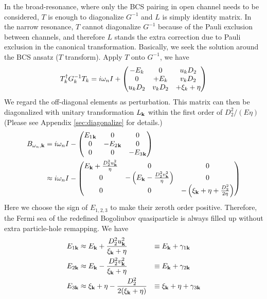 In the broad-resonance, where only the BCS pairing in open channel needs to be considered, $T$ is enough to diagonalize $G^{-1}$ and $L$ is simply identity matrix.  %
In the narrow resonance, $T$ cannot diagonalize $G^{-1}$ because of the Pauli exclusion between channels, and therefore $L$ stands the extra correction due to Pauli exclusion in the canonical transformation. Basically, we seek the solution around the BCS ansatz ($T$ transform). 
Apply $T$ onto $G^{-1}$, we have 
\begin{equation}\label{eq:pathInt2:G2}
T_k^{\dagger}G_k^{-1}T_k=i\omega_nI+\begin{pmatrix}-E_k&0&u_kD_2\\0&+E_k&v_kD_2\\u_kD_2&v_kD_2&+\xi_k+\eta\end{pmatrix}
\end{equation}
We regard the off-diagonal elements as perturbation.  This matrix can then be diagonalized with  unitary transformation $L_{\mathbf{k}}$ within the first order of $D_{2}^{2}/(E\eta)$  (Please see Appendix \ref{sec:diagonalize} for details.)
\begin{equation}
\begin{split}
B_{\omega_{n},\mathbf{k}}&=i\omega_{n}I-
	\begin{pmatrix}E_{1}{}_{\mathbf{k}}&0&0\\0&-E_{2}{}_{\mathbf{k}}&0\\0&0&-E_{3}{}_{\mathbf{k}}\end{pmatrix}\\
	&\approx{}i\omega_{n}I-
	\begin{pmatrix}E_{\mathbf{k}}+\frac{D_{2}^{2}u_{\mathbf{k}}^{2}}{\eta}&0&0\\
	0&-\left(E_{\mathbf{k}}-\frac{D_{2}^{2}v_{\mathbf{k}}^{2}}{\eta}\right)&0\\0&0&-\left(\xi_{\mathbf{k}}+\eta+\frac{D_{2}^{2}}{2\eta}\right)\end{pmatrix}
\end{split}	
\end{equation}
Here we choose the sign of $E_{1,2,3}$  to make their zeroth order positive.  Therefore, the Fermi sea of the redefined Bogoliubov quasiparticle is always filled up without extra particle-hole remapping.  We have 
\begin{align}\label{eq:pathInt2:xiExpand}
E_{1\mathbf{k}}&\approx{}E_{\mathbf{k}}+\frac{D_{2}^{2}u_{\mathbf{k}}^{2}}{\xi_{\mathbf{k}}+\eta}&\equiv{}&E_{\mathbf{k}}+\gamma_{1\mathbf{k}}\\
E_{2\mathbf{k}}&\approx{}E_{\mathbf{k}}-\frac{D_{2}^{2}v_{\mathbf{k}}^{2}}{\xi_{\mathbf{k}}+\eta}&\equiv{}&E_{\mathbf{k}}+\gamma_{2\mathbf{k}}
\label{eq:pathInt2:xiExpand2}\\
E_{3\mathbf{k}}&\approx{}\xi_{\mathbf{k}}+\eta-\frac{D_{2}^{2}}{2(\xi_{\mathbf{k}}+\eta)}&\equiv{}&\xi_{\mathbf{k}}+\eta+\gamma_{3\mathbf{k}}
\label{eq:pathInt2:xiExpand3}
\end{align}

